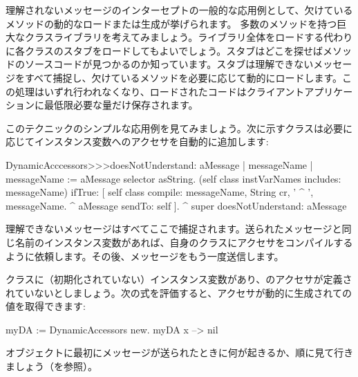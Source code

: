 \documentclass[a4paper,10pt,twoside]{book}
\begin{document}
理解されないメッセージのインターセプトの一般的な応用例として、欠けているメソッドの動的なロードまたは生成が挙げられます。
多数のメソッドを持つ巨大なクラスライブラリを考えてみましょう。ライブラリ全体をロードする代わりに各クラスのスタブをロードしてもよいでしょう。スタブはどこを探せばメソッドのソースコードが見つかるのか知っています。スタブは理解できないメッセージをすべて捕捉し、欠けているメソッドを必要に応じて動的にロードします。この処理はいずれ行われなくなり、ロードされたコードはクライアントアプリケーションに最低限必要な量だけ保存されます。


このテクニックのシンプルな応用例を見てみましょう。次に示すクラスは必要に応じてインスタンス変数へのアクセサを自動的に追加します:

\begin{code}{}
DynamicAcccessors>>>doesNotUnderstand: aMessage
	| messageName |
	messageName := aMessage selector asString.
	(self class instVarNames includes: messageName)
		ifTrue: [
			self class compile: messageName, String cr, ' ^ ', messageName.
			^ aMessage sendTo: self ].
	^ super doesNotUnderstand: aMessage
\end{code}
理解できないメッセージはすべてここで捕捉されます。送られたメッセージと同じ名前のインスタンス変数があれば、自身のクラスにアクセサをコンパイルするように依頼します。その後、メッセージをもう一度送信します。

クラスに（初期化されていない）インスタンス変数があり、のアクセサが定義されていないとしましょう。次の式を評価すると、アクセサが動的に生成されての値を取得できます:
\begin{code}{}
myDA := DynamicAccessors new.
myDA x --> nil
\end{code}

オブジェクトに最初にメッセージが送られたときに何が起きるか、順に見て行きましょう（を参照）。
\end{document}
